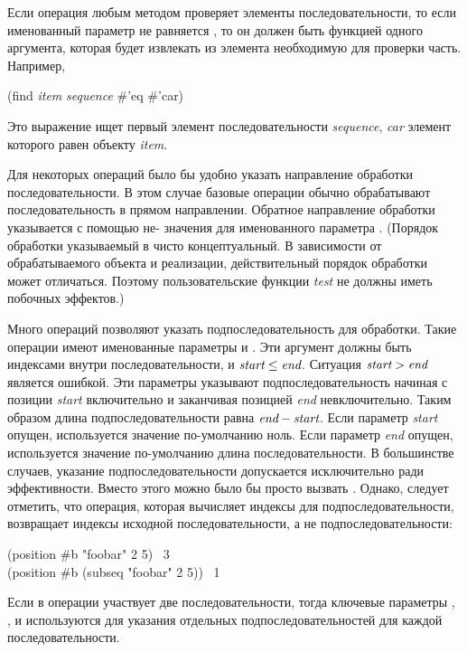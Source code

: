 Если операция любым методом проверяет элементы последовательности, 
то если именованный параметр  не равняется {\false}, то он должен быть
функцией одного аргумента, которая будет извлекать из элемента необходимую для
проверки часть.
Например,
\begin{lisp}
(find \emph{item} \emph{sequence}  \#'eq  \#'car)
\end{lisp}
Это выражение ищет первый элемент последовательности \emph{sequence}, \emph{car}
элемент которого равен  объекту \emph{item}.

Для некоторых операций было бы удобно указать направление обработки
последовательности. В этом случае базовые операции обычно обрабатывают
последовательность в прямом направлении. Обратное направление обработки
указывается с помощью не-{\false} значения для именованного параметра
. (Порядок обработки указываемый в  чисто
концептуальный. В зависимости от обрабатываемого объекта и реализации,
действительный порядок обработки может отличаться. Поэтому пользовательские
функции \emph{test} не должны иметь побочных эффектов.)

Много операций позволяют указать подпоследовательность для обработки. Такие
операции имеют именованные параметры  и . Эти аргумент
должны быть индексами внутри последовательности, и
$\emph{start}\leq\emph{end}$. Ситуация $\emph{start}>\emph{end}$ является
ошибкой. Эти параметры указывают подпоследовательность начиная с позиции \emph{start}
включительно и заканчивая позицией \emph{end} невключительно. Таким образом
длина подпоследовательности равна $\emph{end}-\emph{start}$. Если параметр
\emph{start} опущен, используется значение по-умолчанию ноль. Если параметр
\emph{end} опущен, используется значение по-умолчанию длина последовательности.
В большинстве случаев, указание подпоследовательности допускается исключительно
ради эффективности. Вместо этого можно было бы просто вызвать
. Однако, следует отметить, что операция, которая вычисляет индексы
для подпоследовательности, возвращает индексы исходной последовательности, а не
подпоследовательности:
\begin{lisp}
(position \#{\Xbackslash}b "foobar"  2  5) \EV\ 3 \\
(position \#{\Xbackslash}b (subseq "foobar" 2 5)) \EV\ 1
\end{lisp}
Если в операции участвует две последовательности, тогда ключевые параметры
, ,  и  используются для указания
отдельных подпоследовательностей для каждой последовательности.

